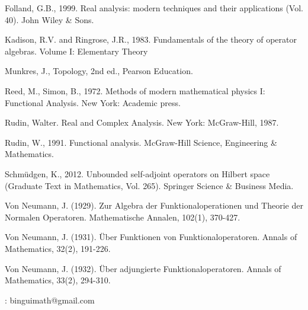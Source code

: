 \documentclass[12pt,b5paper,notitlepage]{article}
\theoremstyle{definition}
\theoremstyle{plain}
\numberwithin{equation}{section}
\begin{document}
\printindex	
	\begin{thebibliography}{999999}
		\footnotesize	
		
		
		
		
		
Folland, G.B., 1999. Real analysis: modern techniques and their applications (Vol. 40). John Wiley \& Sons.	
		
Kadison, R.V. and Ringrose, J.R., 1983. Fundamentals of the theory of operator algebras. Volume I: Elementary Theory

Munkres, J., Topology, 2nd ed., Pearson Education.

Reed, M., Simon, B., 1972. Methods of modern mathematical physics I: Functional Analysis. New York: Academic press.

Rudin, Walter. Real and Complex Analysis. New York: McGraw-Hill, 1987.
		
Rudin, W., 1991. Functional analysis. McGraw-Hill Science, Engineering \& Mathematics.
	
Schm\"udgen, K., 2012. Unbounded self-adjoint operators on Hilbert space (Graduate Text in Mathematics, Vol. 265). Springer Science \& Business Media.
		
		

Von Neumann, J. (1929). Zur Algebra der Funktionaloperationen und Theorie der Normalen Operatoren. Mathematische Annalen, 102(1), 370-427.


Von Neumann, J. (1931). \"Uber Funktionen von Funktionaloperatoren. Annals of Mathematics, 32(2), 191-226.


Von Neumann, J. (1932). \"Uber adjungierte Funktionaloperatoren. Annals of Mathematics, 33(2), 294-310.





		
	\end{thebibliography}
	
	: binguimath@gmail.com
\end{document}
